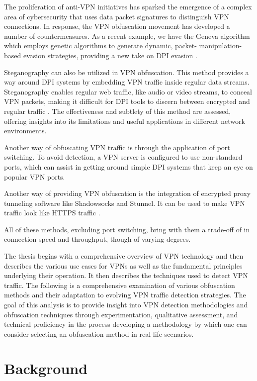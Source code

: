 \documentclass[12pt, fleqn, a4paper]{article}
\begin{document}
The proliferation of anti-VPN initiatives has sparked the emergence of a complex area of cybersecurity that uses data packet signatures to distinguish VPN connections. In response, the VPN obfuscation movement has developed a number of countermeasures. As a recent example, we have the Geneva algorithm which employs genetic algorithms to generate dynamic, packet-
manipulation-based evasion strategies, providing a new take on DPI evasion \citep{Geneva}.

Steganography can also be utilized in VPN obfuscation. This method provides a way around DPI systems by embedding VPN traffic inside regular data streams. Steganography enables regular web traffic, like audio or video streams, to conceal VPN packets, making it difficult for DPI tools to discern between encrypted and regular traffic \citep{Stega}. The effectiveness and subtlety of this method are assessed, offering insights into its limitations and useful applications in different network environments.

Another way of obfuscating VPN traffic is through the application of port switching. To avoid detection, a VPN server is configured to use non-standard ports, which can assist in getting around simple DPI systems that keep an eye on popular VPN ports. 

Another way of providing VPN obfuscation is the integration of encrypted proxy tunneling software like Shadowsocks and Stunnel. It can be used to make VPN traffic look like HTTPS traffic \citep{Shadowsocks}. 

All of these methods, excluding port switching, bring with them a trade-off of in connection speed and throughput, 
though of varying degrees.

The thesis begins with a comprehensive overview of VPN technology and then describes the various use cases for VPNs as well as the fundamental principles underlying their operation. It then describes the techniques used to detect VPN traffic. The following is a comprehensive examination of various obfuscation methods and their adaptation to evolving VPN traffic detection strategies. The goal of this analysis is to provide insight into VPN detection methodologies and obfuscation techniques through experimentation, qualitative assessment, and technical proficiency in the process developing a methodology by which one can consider selecting an obfuscation method in real-life scenarios.

\section{Background}
\end{document}
